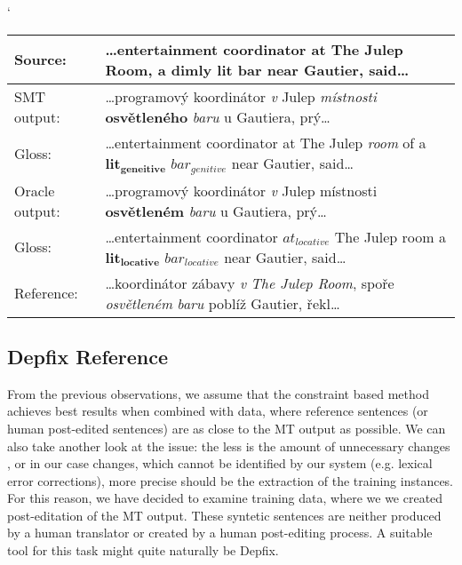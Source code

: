 \begin{myexample}
    \small
    \catcode`
    \begin{center}
    \begin{tabular}{|l|p{}|}
    \hline
    \textbf{Source:}  &  \textbf{…entertainment coordinator at The Julep Room, a dimly lit bar near Gautier, said…}  \\
    \hline
    SMT output:  &  …programový koordinátor \textit{v} Julep \textit{místnosti} \textbf{osvětleného} \textit{baru} u Gautiera, prý…  \\
    \hline
    Gloss:  &  …entertainment coordinator at The Julep \textit{room} of a $\mathbf{lit_{geneitive}}$ $\mathit{bar_{genitive}}$ near Gautier, said…  \\
    \hline
    Oracle output:  &  …programový koordinátor \textit{v} Julep místnosti \textbf{osvětleném} \textit{baru} u Gautiera, prý…  \\
    \hline
    Gloss:  &  …entertainment coordinator $\mathit{at_{locative}}$ The Julep room a $\mathbf{lit_{locative}}$ $\mathit{bar_{locative}}$ near Gautier, said…  \\
    \hline
    Reference:  &  …koordinátor zábavy \textit{v} \textit{The Julep Room}, spoře \textit{osvětleném} \textit{baru} poblíž Gautier, řekl…  \\
    \hline
    \end{tabular}
    \label{ex-oracle-ambig}
    \end{center}
\end{myexample}

\subsection{Depfix Reference}

From the previous observations, we assume that the constraint based method achieves
best results when combined with data, where reference sentences
(or human post-edited sentences) are as close to the MT output as possible.
We can also take another look at the issue: the less is the amount of unnecessary changes
, or in our case changes, which cannot be identified by our system (e.g. lexical error corrections),
more precise should be the extraction of the training instances.
For this reason, we have decided to examine training data, where we we created  post-editation
of the MT output. These syntetic sentences are neither produced by a human translator
or created by a human post-editing process. A suitable tool for this task might quite naturally be Depfix.

